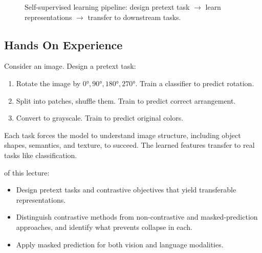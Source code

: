 \begin{figure}
\centering
{}
\caption{Self-supervised learning pipeline: design pretext task $\to$ learn representations $\to$ transfer to downstream tasks.}
\label{fig:ssl_pipeline}
\end{figure}

\subsection{Hands On Experience}

Consider an image. Design a pretext task:
\begin{enumerate}
    \item Rotate the image by $0°, 90°, 180°, 270°$. Train a classifier to predict rotation.
    \item Split into patches, shuffle them. Train to predict correct arrangement.
    \item Convert to grayscale. Train to predict original colors.
\end{enumerate}


Each task forces the model to understand image structure, including object shapes, semantics, and texture, to succeed. The learned features transfer to real tasks like classification.

 of this lecture:
\begin{itemize}
    \item Design pretext tasks and contrastive objectives that yield transferable representations.
    \item Distinguish contrastive methods from non-contrastive and masked-prediction approaches, and identify what prevents collapse in each.
    \item Apply masked prediction for both vision and language modalities.
\end{itemize}

